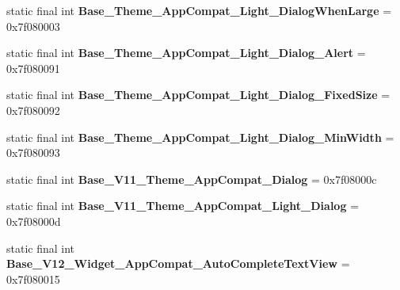 \begin{DoxyCompactItemize}
\item 
\hypertarget{classandroid_1_1support_1_1design_1_1_r_1_1style_a0ad4907d451d72d762746efffaf2eb0a}{}static final int {\bfseries Base\+\_\+\+Theme\+\_\+\+App\+Compat\+\_\+\+Light\+\_\+\+Dialog\+When\+Large} = 0x7f080003\label{classandroid_1_1support_1_1design_1_1_r_1_1style_a0ad4907d451d72d762746efffaf2eb0a}

\item 
\hypertarget{classandroid_1_1support_1_1design_1_1_r_1_1style_ab4c97086018fdcb13c697486f0bc95d9}{}static final int {\bfseries Base\+\_\+\+Theme\+\_\+\+App\+Compat\+\_\+\+Light\+\_\+\+Dialog\+\_\+\+Alert} = 0x7f080091\label{classandroid_1_1support_1_1design_1_1_r_1_1style_ab4c97086018fdcb13c697486f0bc95d9}

\item 
\hypertarget{classandroid_1_1support_1_1design_1_1_r_1_1style_a226a2a22f1ac3a745bc2564cd99de646}{}static final int {\bfseries Base\+\_\+\+Theme\+\_\+\+App\+Compat\+\_\+\+Light\+\_\+\+Dialog\+\_\+\+Fixed\+Size} = 0x7f080092\label{classandroid_1_1support_1_1design_1_1_r_1_1style_a226a2a22f1ac3a745bc2564cd99de646}

\item 
\hypertarget{classandroid_1_1support_1_1design_1_1_r_1_1style_af0527dd1a67e7b9b0a12f3aee871151a}{}static final int {\bfseries Base\+\_\+\+Theme\+\_\+\+App\+Compat\+\_\+\+Light\+\_\+\+Dialog\+\_\+\+Min\+Width} = 0x7f080093\label{classandroid_1_1support_1_1design_1_1_r_1_1style_af0527dd1a67e7b9b0a12f3aee871151a}

\item 
\hypertarget{classandroid_1_1support_1_1design_1_1_r_1_1style_a43e7623f508a10b44e65d66db7435b9e}{}static final int {\bfseries Base\+\_\+\+V11\+\_\+\+Theme\+\_\+\+App\+Compat\+\_\+\+Dialog} = 0x7f08000c\label{classandroid_1_1support_1_1design_1_1_r_1_1style_a43e7623f508a10b44e65d66db7435b9e}

\item 
\hypertarget{classandroid_1_1support_1_1design_1_1_r_1_1style_a2065053a023cfdf714de0262b23016ba}{}static final int {\bfseries Base\+\_\+\+V11\+\_\+\+Theme\+\_\+\+App\+Compat\+\_\+\+Light\+\_\+\+Dialog} = 0x7f08000d\label{classandroid_1_1support_1_1design_1_1_r_1_1style_a2065053a023cfdf714de0262b23016ba}

\item 
\hypertarget{classandroid_1_1support_1_1design_1_1_r_1_1style_a6f46cb91a0f1775c5399547dca533f7f}{}static final int {\bfseries Base\+\_\+\+V12\+\_\+\+Widget\+\_\+\+App\+Compat\+\_\+\+Auto\+Complete\+Text\+View} = 0x7f080015\label{classandroid_1_1support_1_1design_1_1_r_1_1style_a6f46cb91a0f1775c5399547dca533f7f}


\end{DoxyCompactItemize}
